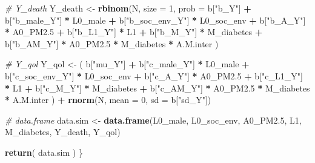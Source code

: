 \documentclass[
]{book}
\newenvironment{Shaded}{\begin{snugshade}}{\end{snugshade}}
\newcommand{\AttributeTok}[1]{\textcolor[rgb]{0.13,0.29,0.53}{#1}}
\newcommand{\CommentTok}[1]{\textcolor[rgb]{0.56,0.35,0.01}{\textit{#1}}}
\newcommand{\DecValTok}[1]{\textcolor[rgb]{0.00,0.00,0.81}{#1}}
\newcommand{\FloatTok}[1]{\textcolor[rgb]{0.00,0.00,0.81}{#1}}
\newcommand{\FunctionTok}[1]{\textcolor[rgb]{0.13,0.29,0.53}{\textbf{#1}}}
\newcommand{\NormalTok}[1]{#1}
\newcommand{\OtherTok}[1]{\textcolor[rgb]{0.56,0.35,0.01}{#1}}
\newcommand{\SpecialCharTok}[1]{\textcolor[rgb]{0.81,0.36,0.00}{\textbf{#1}}}
\newcommand{\StringTok}[1]{\textcolor[rgb]{0.31,0.60,0.02}{#1}}
\begin{document}
\begin{Shaded}
\begin{Highlighting}[]
  \CommentTok{\# Y\_death }
\NormalTok{  Y\_death }\OtherTok{\textless{}{-}} \FunctionTok{rbinom}\NormalTok{(N, }\AttributeTok{size =} \DecValTok{1}\NormalTok{, }\AttributeTok{prob =}\NormalTok{ b[}\StringTok{"b\_Y"}\NormalTok{] }\SpecialCharTok{+} 
\NormalTok{                      b[}\StringTok{"b\_male\_Y"}\NormalTok{] }\SpecialCharTok{*}\NormalTok{ L0\_male }\SpecialCharTok{+} 
\NormalTok{                      b[}\StringTok{"b\_soc\_env\_Y"}\NormalTok{] }\SpecialCharTok{*}\NormalTok{ L0\_soc\_env }\SpecialCharTok{+} 
\NormalTok{                      b[}\StringTok{"b\_A\_Y"}\NormalTok{] }\SpecialCharTok{*}\NormalTok{ A0\_PM2}\FloatTok{.5} \SpecialCharTok{+} 
\NormalTok{                      b[}\StringTok{"b\_L1\_Y"}\NormalTok{] }\SpecialCharTok{*}\NormalTok{ L1 }\SpecialCharTok{+}
\NormalTok{                      b[}\StringTok{"b\_M\_Y"}\NormalTok{] }\SpecialCharTok{*}\NormalTok{ M\_diabetes }\SpecialCharTok{+}
\NormalTok{                      b[}\StringTok{"b\_AM\_Y"}\NormalTok{] }\SpecialCharTok{*}\NormalTok{ A0\_PM2}\FloatTok{.5} \SpecialCharTok{*}\NormalTok{ M\_diabetes }\SpecialCharTok{*}\NormalTok{ A.M.inter ) }
  
  \CommentTok{\# Y\_qol }
\NormalTok{  Y\_qol }\OtherTok{\textless{}{-}}\NormalTok{ ( b[}\StringTok{"mu\_Y"}\NormalTok{] }\SpecialCharTok{+} 
\NormalTok{               b[}\StringTok{"c\_male\_Y"}\NormalTok{] }\SpecialCharTok{*}\NormalTok{ L0\_male }\SpecialCharTok{+} 
\NormalTok{               b[}\StringTok{"c\_soc\_env\_Y"}\NormalTok{] }\SpecialCharTok{*}\NormalTok{ L0\_soc\_env }\SpecialCharTok{+}
\NormalTok{               b[}\StringTok{"c\_A\_Y"}\NormalTok{] }\SpecialCharTok{*}\NormalTok{ A0\_PM2}\FloatTok{.5} \SpecialCharTok{+}
\NormalTok{               b[}\StringTok{"c\_L1\_Y"}\NormalTok{] }\SpecialCharTok{*}\NormalTok{ L1 }\SpecialCharTok{+}
\NormalTok{               b[}\StringTok{"c\_M\_Y"}\NormalTok{] }\SpecialCharTok{*}\NormalTok{ M\_diabetes }\SpecialCharTok{+} 
\NormalTok{               b[}\StringTok{"c\_AM\_Y"}\NormalTok{] }\SpecialCharTok{*}\NormalTok{ A0\_PM2}\FloatTok{.5} \SpecialCharTok{*}\NormalTok{ M\_diabetes }\SpecialCharTok{*}\NormalTok{ A.M.inter ) }\SpecialCharTok{+} 
    \FunctionTok{rnorm}\NormalTok{(N, }\AttributeTok{mean =} \DecValTok{0}\NormalTok{, }\AttributeTok{sd =}\NormalTok{ b[}\StringTok{"sd\_Y"}\NormalTok{])}
  
  \CommentTok{\# data.frame}
\NormalTok{  data.sim }\OtherTok{\textless{}{-}} \FunctionTok{data.frame}\NormalTok{(L0\_male, L0\_soc\_env, A0\_PM2}\FloatTok{.5}\NormalTok{, L1, M\_diabetes, }
\NormalTok{                         Y\_death, Y\_qol)}

  \FunctionTok{return}\NormalTok{( data.sim )}
\NormalTok{\}}
\end{Highlighting}
\end{Shaded}
\end{document}
